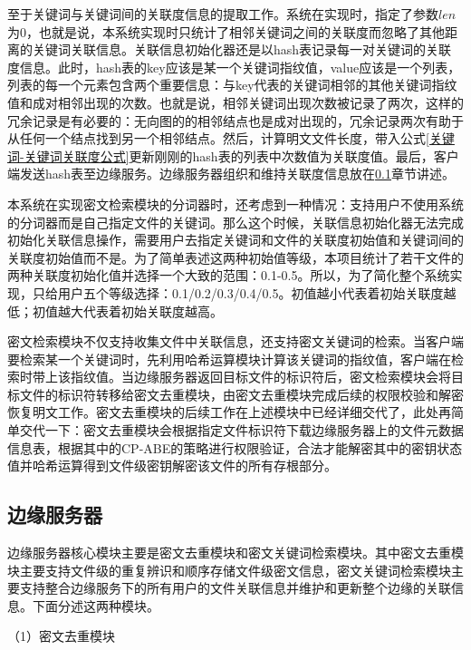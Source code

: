 \documentclass[promaster]{thesis-uestc}
\begin{document}
至于关键词与关键词间的关联度信息的提取工作。系统在实现时，指定了参数$len$为0，也就是说，本系统实现时只统计了相邻关键词之间的关联度而忽略了其他距离的关键词关联信息。关联信息初始化器还是以hash表记录每一对关键词的关联度信息。此时，hash表的key应该是某一个关键词指纹值，value应该是一个列表，列表的每一个元素包含两个重要信息：与key代表的关键词相邻的其他关键词指纹值和成对相邻出现的次数。也就是说，相邻关键词出现次数被记录了两次，这样的冗余记录是有必要的：无向图的的相邻结点也是成对出现的，冗余记录两次有助于从任何一个结点找到另一个相邻结点。然后，计算明文文件长度，带入公式\ref{关键词-关键词关联度公式}更新刚刚的hash表的列表中次数值为关联度值。最后，客户端发送hash表至边缘服务。边缘服务器组织和维持关联度信息放在\ref{边缘服务器的实现}章节讲述。

本系统在实现密文检索模块的分词器时，还考虑到一种情况：支持用户不使用系统的分词器而是自己指定文件的关键词。那么这个时候，关联信息初始化器无法完成初始化关联信息操作，需要用户去指定关键词和文件的关联度初始值和关键词间的关联度初始值而不是。为了简单表述这两种初始值等级，本项目统计了若干文件的两种关联度初始化值并选择一个大致的范围：0.1-0.5。所以，为了简化整个系统实现，只给用户五个等级选择：0.1/0.2/0.3/0.4/0.5。初值越小代表着初始关联度越低；初值越大代表着初始关联度越高。

密文检索模块不仅支持收集文件中关联信息，还支持密文关键词的检索。当客户端要检索某一个关键词时，先利用哈希运算模块计算该关键词的指纹值，客户端在检索时带上该指纹值。当边缘服务器返回目标文件的标识符后，密文检索模块会将目标文件的标识符转移给密文去重模块，由密文去重模块完成后续的权限校验和解密恢复明文工作。密文去重模块的后续工作在上述模块中已经详细交代了，此处再简单交代一下：密文去重模块会根据指定文件标识符下载边缘服务器上的文件元数据信息表，根据其中的CP-ABE的策略进行权限验证，合法才能解密其中的密钥状态值并哈希运算得到文件级密钥解密该文件的所有存根部分。

\subsection{边缘服务器}\label{边缘服务器的实现}
边缘服务器核心模块主要是密文去重模块和密文关键词检索模块。其中密文去重模块主要支持文件级的重复辨识和顺序存储文件级密文信息，密文关键词检索模块主要支持整合边缘服务下的所有用户的文件关联信息并维护和更新整个边缘的关联信息。下面分述这两种模块。

（1）密文去重模块
\end{document}

